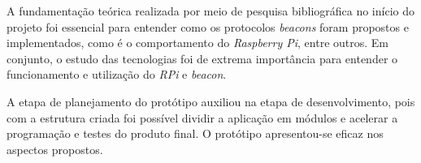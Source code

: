 \documentclass[
		12pt,				%
		openright,			%
		oneside,			%
		a4paper,			%
		chapter=TITLE,		%
		english,			%
		brazil				%
	]{abntex2}
\begin{document}
A fundamentação teórica realizada por meio de pesquisa bibliográfica no início do projeto foi essencial para entender como os protocolos \textit{beacons} foram propostos e implementados, como é o comportamento do \textit{Raspberry Pi}, entre outros. Em conjunto, o estudo das tecnologias foi de extrema importância para entender o funcionamento e utilização do \textit{RPi} e \textit{beacon}.

A etapa de planejamento do protótipo auxiliou na etapa de desenvolvimento, pois com a estrutura criada foi possível dividir a aplicação em módulos e acelerar a programação e testes do produto final. O protótipo apresentou-se eficaz nos aspectos propostos. 







\end{document}
